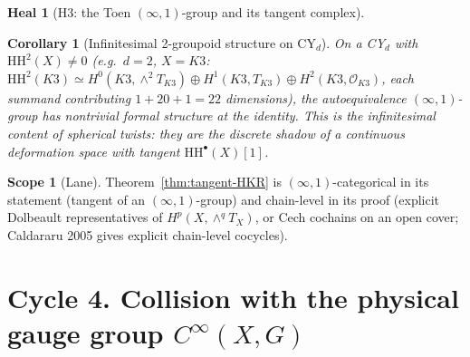 \documentclass[11pt]{amsart}
\newtheorem{corollary}[theorem]{Corollary}
\theoremstyle{definition}
\newtheorem{heal}[attack]{Heal}
\newtheorem{scope}[theorem]{Scope}
\providecommand{\cO}{\mathcal{O}}
\begin{document}
\begin{heal}[H3: the Toen $(\infty,1)$-group and its tangent
complex]
\begin{corollary}[Infinitesimal 2-groupoid structure on CY$_d$]
\label{cor:infinitesimal-2gpd}
On a CY$_d$ with $\mathrm{HH}^2(X) \neq 0$ (e.g.\ $d = 2$, $X = K3$:
$\mathrm{HH}^2(K3) \simeq H^0(K3, \wedge^2 T_{K3}) \oplus
H^1(K3, T_{K3}) \oplus H^2(K3, \cO_{K3})$, each summand contributing
$1 + 20 + 1 = 22$ dimensions), the autoequivalence
$(\infty,1)$-group has nontrivial formal structure at the identity.
This is the infinitesimal content of spherical twists: they are the
discrete shadow of a continuous deformation space with tangent
$\mathrm{HH}^\bullet(X)[1]$.
\end{corollary}

\begin{scope}[Lane]
Theorem~\ref{thm:tangent-HKR} is $(\infty,1)$-categorical in its
statement (tangent of an $(\infty,1)$-group) and chain-level in its
proof (explicit Dolbeault representatives of
$H^p(X, \wedge^q T_X)$, or Cech cochains on an open cover; Caldararu
2005 gives explicit chain-level cocycles).
\end{scope}
\end{heal}

\section{Cycle 4. Collision with the physical gauge group $C^\infty(X, G)$}
\label{sec:cycle-gauge}
\end{document}
